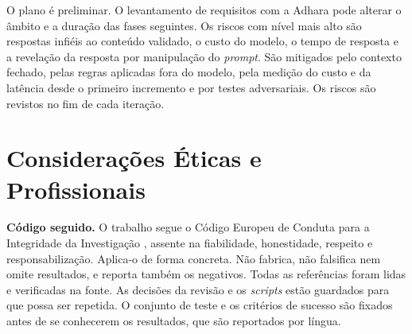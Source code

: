 \documentclass[11pt,a4paper]{article}
\begin{document}
O plano é preliminar. O levantamento de requisitos com a Adhara pode alterar o âmbito e a duração das fases seguintes. Os riscos com nível mais alto são respostas infiéis ao conteúdo validado, o custo do modelo, o tempo de resposta e a revelação da resposta por manipulação do \emph{prompt}. São mitigados pelo contexto fechado, pelas regras aplicadas fora do modelo, pela medição do custo e da latência desde o primeiro incremento e por testes adversariais. Os riscos são revistos no fim de cada iteração.

\section{Considerações Éticas e Profissionais}

\textbf{Código seguido.} O trabalho segue o Código Europeu de Conduta para a Integridade da Investigação \parencite{allea2023code}, assente na fiabilidade, honestidade, respeito e responsabilização. Aplica-o de forma concreta. Não fabrica, não falsifica nem omite resultados, e reporta também os negativos. Todas as referências foram lidas e verificadas na fonte. As decisões da revisão e os \emph{scripts} estão guardados para que possa ser repetida. O conjunto de teste e os critérios de sucesso são fixados antes de se conhecerem os resultados, que são reportados por língua.
\end{document}
